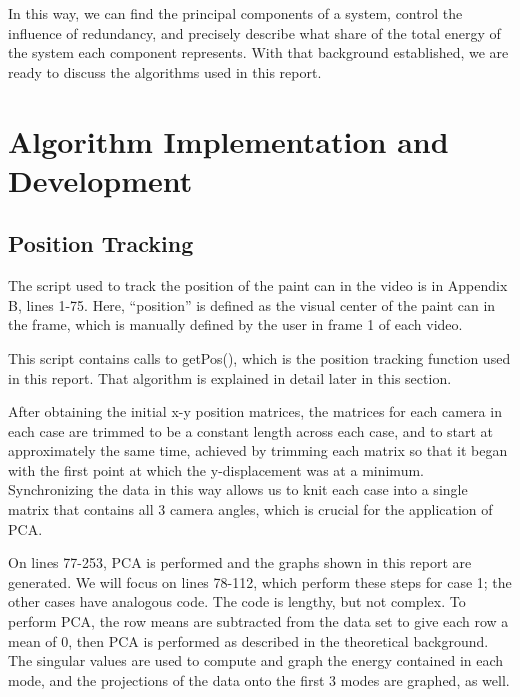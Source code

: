 \documentclass[a4paper,10 pt]{article}
\begin{document}
In this way, we can find the principal components of a system, control the influence of redundancy, and precisely describe what share of the total energy of the system each component represents. With that background established, we are ready to discuss the algorithms used in this report.

\section{Algorithm Implementation and Development}
\subsection{Position Tracking}
The script used to track the position of the paint can in the video is in Appendix B, lines 1-75. Here, ``position'' is defined as the visual center of the paint can in the frame, which is manually defined by the user in frame 1 of each video.

This script contains calls to getPos(), which is the position tracking function used in this report. That algorithm is explained in detail later in this section.

After obtaining the initial x-y position matrices, the matrices for each camera in each case are trimmed to be a constant length across each case, and to start at approximately the same time, achieved by trimming each matrix so that it began with the first point at which the y-displacement was at a minimum. Synchronizing the data in this way allows us to knit each case into a single matrix that contains all 3 camera angles, which is crucial for the application of PCA.

On lines 77-253, PCA is performed and the graphs shown in this report are generated. We will focus on lines 78-112, which perform these steps for case 1; the other cases have analogous code. The code is lengthy, but not complex. To perform PCA, the row means are subtracted from the data set to give each row a mean of 0, then PCA is performed as described in the theoretical background. The singular values are used to compute and graph the energy contained in each mode, and the projections of the data onto the first 3 modes are graphed, as well.
\end{document}
